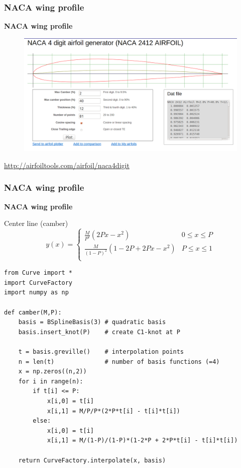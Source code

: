 \documentclass{beamer}
\theoremstyle{plain}
\theoremstyle{definition}
\begin{document}
\begin{frame}[fragile]
\frametitle{NACA wing profile}
\textbf{NACA wing profile}

\begin{figure}[h]
    \centering
    \includegraphics[width=0.8\linewidth]{naca-webpage}
\end{figure}
\url{http://airfoiltools.com/airfoil/naca4digit}

\end{frame}


\begin{frame}[fragile]
\frametitle{NACA wing profile}
\textbf{NACA wing profile}

Center line (camber)
\begin{equation*}
    y(x) = \left\{
    \begin{array}{ll}
        \frac{M}{P^2}(2Px-x^2)          & 0\leq x\leq P \\
        \frac{M}{(1-P)^2}(1-2P+2Px-x^2) & P\leq x\leq 1 \\
    \end{array}
    \right.
\end{equation*}
\begin{listing}[H]
    \tiny
    \begin{verbatim}
from Curve import *
import CurveFactory
import numpy as np

def camber(M,P):
    basis = BSplineBasis(3) # quadratic basis
    basis.insert_knot(P)    # create C1-knot at P

    t = basis.greville()    # interpolation points
    n = len(t)              # number of basis functions (=4)
    x = np.zeros((n,2))
    for i in range(n):
        if t[i] <= P:
            x[i,0] = t[i]
            x[i,1] = M/P/P*(2*P*t[i] - t[i]*t[i])
        else:
            x[i,0] = t[i]
            x[i,1] = M/(1-P)/(1-P)*(1-2*P + 2*P*t[i] - t[i]*t[i])

    return CurveFactory.interpolate(x, basis)
    \end{verbatim}
\end{listing}

\end{frame}
\end{document}
